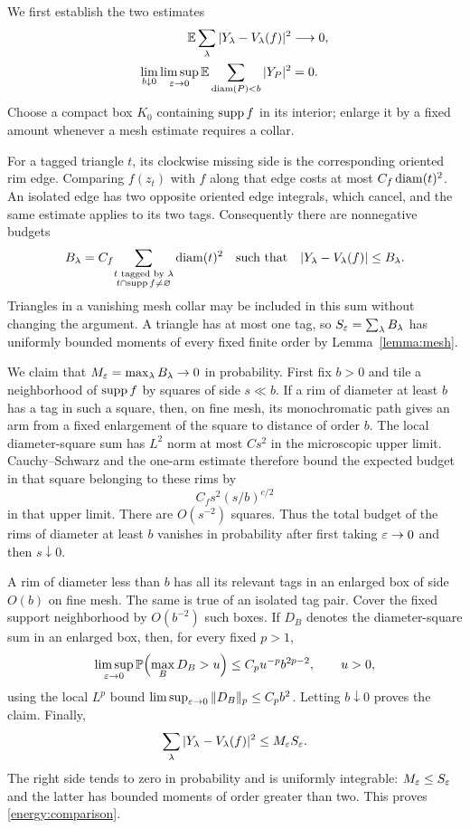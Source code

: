 We first establish the two estimates
\begin{align}
 \mathbb E\sum_\lambda |Y_\lambda-V_\lambda(f)|^2&\longrightarrow0,
 \label{energy:comparison}\\
 \lim_{b\downarrow0}\limsup_{\varepsilon\to0}
 \mathbb E\sum_{\operatorname{diam}(P)<b}|Y_P|^2&=0.
 \label{energy:small-rims}
\end{align}
Choose a compact box $K_0$ containing $\operatorname{supp} f$ in its interior; enlarge it
by a fixed amount whenever a mesh estimate requires a collar.

For a tagged triangle $t$, its clockwise missing side is the corresponding
oriented rim edge. Comparing $f(z_t)$ with $f$ along that edge costs at
most $C_f\operatorname{diam}(t)^2$. An isolated edge has two opposite oriented edge
integrals, which cancel, and the same estimate applies to its two tags.
Consequently there are nonnegative budgets
\[
 B_\lambda=C_f\!\sum_{\substack{t\text{ tagged by }\lambda\\
                         t\cap\operatorname{supp} f\ne\varnothing}}
                         \operatorname{diam}(t)^2
 \quad\text{such that}\quad
 |Y_\lambda-V_\lambda(f)|\le B_\lambda.
\]
Triangles in a vanishing mesh collar may be included in this sum without
changing the argument. A triangle has at most one tag, so
$S_\varepsilon=\sum_\lambda B_\lambda$ has uniformly bounded moments of every
fixed finite order by Lemma~\ref{lemma:mesh}.

We claim that $M_\varepsilon=\max_\lambda B_\lambda\to0$ in probability.
First fix $b>0$ and tile a neighborhood of $\operatorname{supp} f$ by squares of side
$s\ll b$. If a rim of diameter at least $b$ has a tag in such a square,
then, on fine mesh, its monochromatic path gives an arm from a fixed
enlargement of the square to distance of order $b$. The local
diameter-square sum has $L^2$ norm at most $Cs^2$ in the microscopic upper
limit. Cauchy--Schwarz and the one-arm estimate therefore bound the
expected budget in that square belonging to these rims by
\[
                    C_f s^2(s/b)^{c/2}
\]
in that upper limit. There are $O(s^{-2})$ squares. Thus the total budget
of the rims of diameter at least $b$ vanishes in probability after first
taking $\varepsilon\to0$ and then $s\downarrow0$.

A rim of diameter less than $b$ has all its relevant tags in an enlarged
box of side $O(b)$ on fine mesh. The same is true of an isolated tag pair.
Cover the fixed support neighborhood by $O(b^{-2})$ such boxes. If $D_B$
denotes the diameter-square sum in an enlarged box, then, for every fixed
$p>1$,
\[
 \limsup_{\varepsilon\to0}\mathbb P\!\left(\max_B D_B>u\right)
 \le C_p u^{-p}b^{2p-2},\qquad u>0,
\]
using the local $L^p$ bound $\limsup_{\varepsilon\to0}\|D_B\|_p\le C_pb^2$.
Letting $b\downarrow0$ proves the claim. Finally,
\[
 \sum_\lambda |Y_\lambda-V_\lambda(f)|^2
       \le M_\varepsilon S_\varepsilon.
\]
The right side tends to zero in probability and is uniformly integrable:
$M_\varepsilon\le S_\varepsilon$ and the latter has bounded moments of order greater
than two. This proves \eqref{energy:comparison}.

